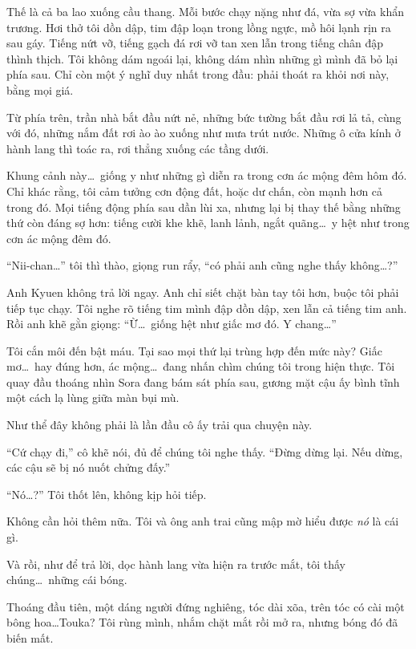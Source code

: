 \documentclass[../main.tex]{subfiles}
\begin{document}

Thế là cả ba lao xuống cầu thang. Mỗi bước chạy nặng như đá, vừa sợ vừa khẩn trương. Hơi thở tôi dồn dập, tim đập loạn trong lồng ngực, mồ hôi lạnh rịn ra sau gáy. Tiếng nứt vỡ, tiếng gạch đá rơi vỡ tan xen lẫn trong tiếng chân đập thình thịch. Tôi không dám ngoái lại, không dám nhìn những gì mình đã bỏ lại phía sau. Chỉ còn một ý nghĩ duy nhất trong đầu: phải thoát ra khỏi nơi này, bằng mọi giá.

Từ phía trên, trần nhà bắt đầu nứt nẻ, những bức tường bắt đầu rơi lả tả, cùng với đó, những nắm đất rơi ào ào xuống như mưa trút nước. Những ô cửa kính ở hành lang thì toác ra, rơi thẳng xuống các tầng dưới.

Khung cảnh này\dots\ giống y như những gì diễn ra trong cơn ác mộng đêm hôm đó. Chỉ khác rằng, tôi cảm tưởng cơn động đất, hoặc dư chấn, còn mạnh hơn cả trong đó. Mọi tiếng động phía sau dần lùi xa, nhưng lại bị thay thế bằng những thứ còn đáng sợ hơn: tiếng cười khe khẽ, lanh lảnh, ngắt quãng\dots\ y hệt như trong cơn ác mộng đêm đó.

``Nii-chan\dots'' tôi thì thào, giọng run rẩy, ``có phải anh cũng nghe thấy không\dots?''

Anh Kyuen không trả lời ngay. Anh chỉ siết chặt bàn tay tôi hơn, buộc tôi phải tiếp tục chạy. Tôi nghe rõ tiếng tim mình đập dồn dập, xen lẫn cả tiếng tim anh. Rồi anh khẽ gằn giọng: ``Ừ\dots\ giống hệt như giấc mơ đó. Y chang\dots''

Tôi cắn môi đến bật máu. Tại sao mọi thứ lại trùng hợp đến mức này? Giấc mơ\dots\ hay đúng hơn, ác mộng\dots\ đang nhấn chìm chúng tôi trong hiện thực. Tôi quay đầu thoáng nhìn Sora đang bám sát phía sau, gương mặt cậu ấy bình tĩnh một cách lạ lùng giữa màn bụi mù.

Như thể đây không phải là lần đầu cô ấy trải qua chuyện này.

``Cứ chạy đi,'' cô khẽ nói, đủ để chúng tôi nghe thấy. ``Đừng dừng lại. Nếu dừng, các cậu sẽ bị nó nuốt chửng đấy.''

``Nó\dots?'' Tôi thốt lên, không kịp hỏi tiếp.

Không cần hỏi thêm nữa. Tôi và ông anh trai cũng mập mờ hiểu được \emph{nó} là cái gì.

Và rồi, như để trả lời, dọc hành lang vừa hiện ra trước mắt, tôi thấy chúng\dots\ những cái bóng.

Thoáng đầu tiên, một dáng người đứng nghiêng, tóc dài xõa, trên tóc có cài một bông hoa\dots Touka? Tôi rùng mình, nhắm chặt mắt rồi mở ra, nhưng bóng đó đã biến mất.
\end{document}
